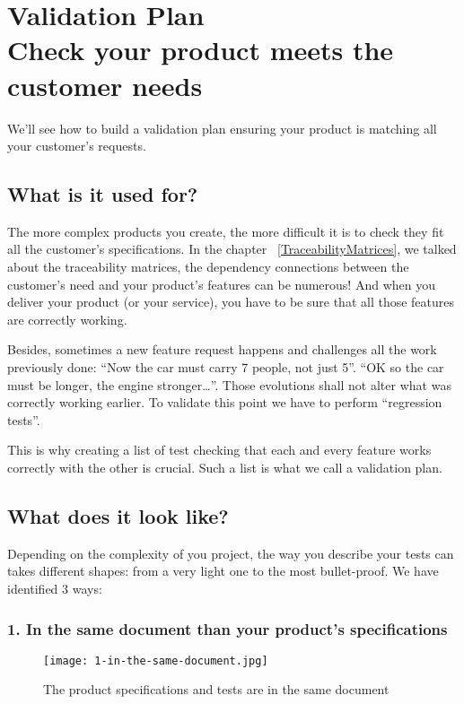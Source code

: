 \setchapterpreamble[u]{\margintoc}
\chapter{Validation Plan\\Check your product meets the customer needs}
\label{sec:ValidationPlan}

We’ll see how to build a validation plan ensuring your product is matching all your customer’s requests.

\section{What is it used for?}

The more complex products you create, the more difficult it is to check they fit all the customer’s specifications. In the chapter ~\ref{TraceabilityMatrices}, we talked about the traceability matrices, the dependency connections between the customer’s need and your product’s features can be numerous! And when you deliver your product (or your service), you have to be sure that all those features are correctly working.

Besides, sometimes a new feature request happens and challenges all the work previously done: “Now the car must carry 7 people, not just 5”. “OK so the car must be longer, the engine stronger…”. Those evolutions shall not alter what was correctly working earlier. To validate this point we have to perform “regression tests”.

This is why creating a list of test checking that each and every feature works correctly with the other is crucial. Such a list is what we call a validation plan.

\section{What does it look like?}
Depending on the complexity of you project, the way you describe your tests can takes different shapes: from a very light one to the most bullet-proof. We have identified 3 ways:

\subsection{1. In the same document than your product’s specifications}

\begin{figure}[h]
    \centering
    \texttt{[image: 1-in-the-same-document.jpg]}
    \caption{The product specifications and tests are in the same document}
    \label{fig:SameDocument}
\end{figure}

